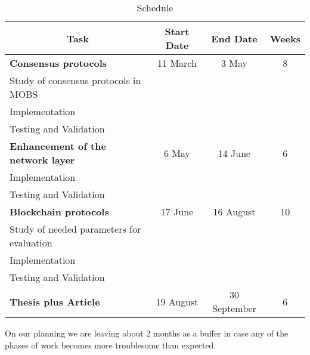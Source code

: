 \begin{table}[ht]
\centering
\caption{Schedule}\label{tab:schedule}
\begin{tabular}{lccc}
  \toprule
  \multicolumn{1}{c}{\textbf{Task}}					& \textbf{Start Date} & \textbf{End Date} & \textbf{Weeks}	\\ 
  \midrule
  \textbf{Consensus protocols}						& 11 March             & 3 May       & 8              	\\
  \quad Study of consensus protocols in MOBS 								&                     &                   &                	\\ 
  \quad Implementation 								&                     &                   &                	\\ 
  \quad Testing and Validation								&                     &                   &                	\\ 
  \midrule
  \textbf{Enhancement of the network layer}					& 6 May            & 14 June          & 6             	\\
  \quad Implementation 								&                     &                   &                	\\ 
  \quad Testing and Validation 								&                     &                   &                	\\
  \midrule
  \textbf{Blockchain protocols}						& 17 June             & 16 August       & 10         	\\
  \quad Study of needed parameters for evaluation 								&                     &                   &                	\\ 
  \quad Implementation 								&                     &                   &                	\\ 
  \quad Testing and Validation								&                     &                   &                	\\ 
  \midrule
  \textbf{Thesis plus Article}									& 19 August           & 30 September      & 6          	  	\\   
  \bottomrule
\end{tabular}
\end{table}

On our planning we are leaving about 2 months as a buffer in case any of the
phases of work becomes more troublesome than expected.